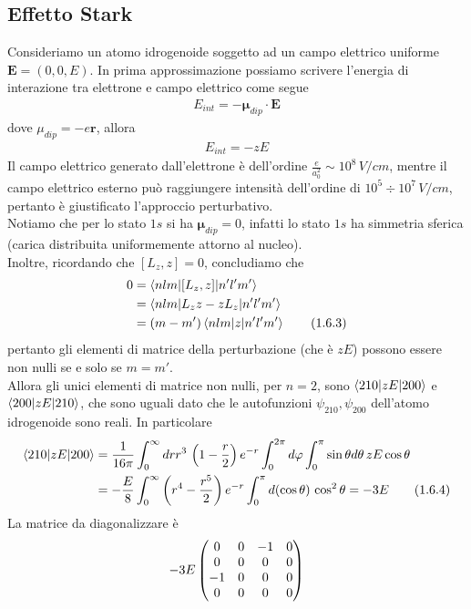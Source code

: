 \documentclass{article}
\begin{document}
\newpage
\subsection{Effetto Stark}
Consideriamo un atomo idrogenoide soggetto ad un campo elettrico uniforme $\mathbf{E} = (0, 0, E)$. In prima approssimazione possiamo scrivere l'energia di interazione tra elettrone e campo elettrico come segue 
\begin{align}
    E_{int} = -\boldsymbol{\mu}_{dip} \cdot \mathbf{E} \tag{1.6.1}
\end{align}
dove $\mu_{dip} = -e\mathbf{r}$, allora
\begin{align}
    E_{int} = -zE \tag{1.6.2}
\end{align}
Il campo elettrico generato dall'elettrone è dell'ordine $\frac{e}{a^2_0} \sim 10^8 \, V/cm$, mentre il campo elettrico esterno può raggiungere intensità dell'ordine di $10^5 \div 10^7 \, V/cm$, pertanto è giustificato l'approccio perturbativo. \\
Notiamo che per lo stato $1s$ si ha $\boldsymbol{\mu}_{dip} = 0$, infatti lo stato $1s$ ha simmetria sferica (carica distribuita uniformemente attorno al nucleo). \\
Inoltre, ricordando che $[L_z, z] = 0$, concludiamo che 
\begin{align}
    0 &= \braket{nlm|[L_z, z]|n'l'm'} \notag \\
    &= \braket{nlm|L_zz - zL_z|n'l'm'} \notag \\
    &= (m - m')\braket{nlm|z|n'l'm'} \tag{1.6.3}
\end{align}
pertanto gli elementi di matrice della perturbazione (che è $zE$) possono essere non nulli se e solo se $m = m'$. \\
Allora gli unici elementi di matrice non nulli, per $n = 2$, sono $\braket{210|zE|200}$ e $\braket{200|zE|210}$, che sono uguali dato che le autofunzioni $\psi_{210}, \psi_{200}$ dell'atomo idrogenoide sono reali. In particolare
\begin{align}
    \braket{210|zE|200} &= \frac{1}{16\pi}\int_0^\infty drr^3 \, \left(1 - \frac{r}{2}\right)e^{-r}\int_0^{2\pi}d\varphi\int_0^\pi\sin\theta d\theta \, zE\cos\theta \notag \\
    &= -\frac{E}{8}\int_0^\infty \left(r^4 - \frac{r^5}{2}\right)e^{-r}\int_0^\pi d(\cos\theta) \, \cos^2\theta = -3E \tag{1.6.4}
\end{align}
La matrice da diagonalizzare è 
\begin{align} -3E
    \begin{pmatrix}
        0 & 0 & -1 & 0 \\
        0 & 0 & 0 & 0 \\
        -1 & 0 & 0 & 0 \\
        0 & 0 & 0 & 0
    \end{pmatrix} \notag
\end{align}
\end{document}
